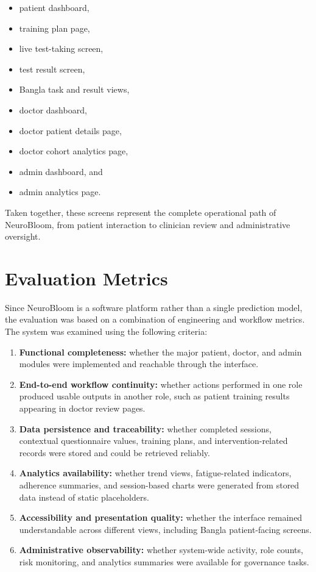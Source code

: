 \documentclass[12pt,a4paper]{report}
\begin{document}
\begin{itemize}[leftmargin=0.6in]
\item patient dashboard,
\item training plan page,
\item live test-taking screen,
\item test result screen,
\item Bangla task and result views,
\item doctor dashboard,
\item doctor patient details page,
\item doctor cohort analytics page,
\item admin dashboard, and
\item admin analytics page.
\end{itemize}

Taken together, these screens represent the complete operational path of NeuroBloom, from patient interaction to clinician review and administrative oversight.

\section{Evaluation Metrics}
Since NeuroBloom is a software platform rather than a single prediction model, the evaluation was based on a combination of engineering and workflow metrics. The system was examined using the following criteria:

\begin{enumerate}[leftmargin=0.6in]
\item \textbf{Functional completeness:} whether the major patient, doctor, and admin modules were implemented and reachable through the interface.
\item \textbf{End-to-end workflow continuity:} whether actions performed in one role produced usable outputs in another role, such as patient training results appearing in doctor review pages.
\item \textbf{Data persistence and traceability:} whether completed sessions, contextual questionnaire values, training plans, and intervention-related records were stored and could be retrieved reliably.
\item \textbf{Analytics availability:} whether trend views, fatigue-related indicators, adherence summaries, and session-based charts were generated from stored data instead of static placeholders.
\item \textbf{Accessibility and presentation quality:} whether the interface remained understandable across different views, including Bangla patient-facing screens.
\item \textbf{Administrative observability:} whether system-wide activity, role counts, risk monitoring, and analytics summaries were available for governance tasks.
\end{enumerate}
\end{document}
